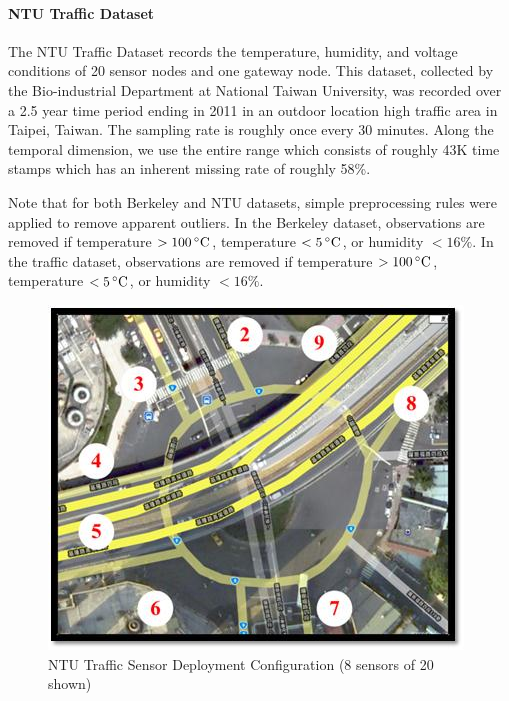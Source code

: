 \paragraph*{NTU Traffic Dataset}

The NTU Traffic Dataset records the temperature, humidity, and voltage conditions of 20 sensor nodes and one gateway node.
This dataset, collected by the Bio-industrial Department at National Taiwan University, was recorded over a 2.5 year time period ending in 2011 in an outdoor location high traffic area in Taipei, Taiwan\cite{liu2011developed}.
The sampling rate is roughly once every 30 minutes.
Along the temporal dimension, we use the entire range which consists of roughly 43K time stamps which has an inherent missing rate of roughly 58\%.

Note that for both Berkeley and NTU datasets, simple preprocessing rules were applied to remove apparent outliers.
In the Berkeley dataset, observations are removed if temperature \mbox{$>100\,^{\circ}\mathrm{C}$}, temperature \mbox{$<5\,^{\circ}\mathrm{C}$}, or humidity \mbox{$<16\%$}.
In the traffic dataset, observations are removed if temperature \mbox{$>100\,^{\circ}\mathrm{C}$}, temperature \mbox{$<5\,^{\circ}\mathrm{C}$}, or humidity \mbox{$<16\%$}.
\begin{figure}[H]
\centering
\includegraphics[scale=0.5]{traffic_wsn.png}
\caption{NTU Traffic Sensor Deployment Configuration (8 sensors of 20 shown)}
\end{figure}


